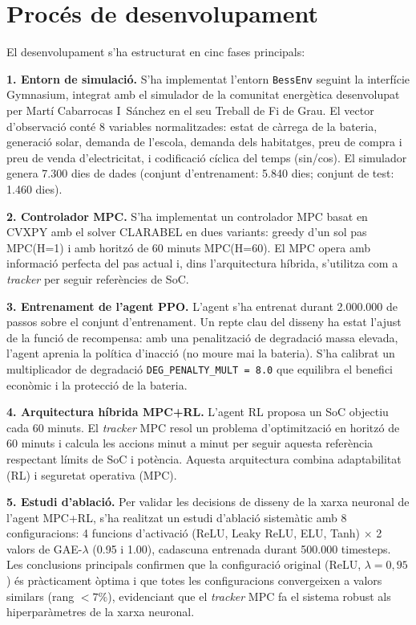 \documentclass[a4paper,12pt]{ThesisStyle}
\begin{document}
\section*{Procés de desenvolupament}

El desenvolupament s'ha estructurat en cinc fases principals:

\textbf{1. Entorn de simulació.} S'ha implementat l'entorn \texttt{BessEnv} seguint la
interfície Gymnasium, integrat amb el simulador de la comunitat energètica desenvolupat per
Martí Cabarrocas I~Sánchez en el seu Treball de Fi de Grau. El vector d'observació conté 8 variables
normalitzades: estat de càrrega de la bateria, generació solar, demanda de l'escola, demanda dels habitatges, preu de compra i preu de venda d'electricitat, i codificació cíclica del temps (sin/cos). El simulador genera 7.300 dies de
dades (conjunt d'entrenament: 5.840 dies; conjunt de test: 1.460 dies).

\textbf{2. Controlador MPC.} S'ha implementat un controlador MPC basat en CVXPY amb el solver
CLARABEL en dues variants: greedy d'un sol pas MPC(H=1) i amb horitzó de 60 minuts MPC(H=60).
El MPC opera amb informació perfecta del pas actual i, dins l'arquitectura híbrida, s'utilitza
com a \textit{tracker} per seguir referències de SoC.

\textbf{3. Entrenament de l'agent PPO.} L'agent s'ha entrenat durant 2.000.000 de passos sobre
el conjunt d'entrenament. Un repte clau del disseny ha estat l'ajust de la funció de recompensa:
amb una penalització de degradació massa elevada, l'agent aprenia la política d'inacció
(no moure mai la bateria). S'ha calibrat un multiplicador de degradació \texttt{DEG\_PENALTY\_MULT
= 8.0} que equilibra el benefici econòmic i la protecció de la bateria.

\textbf{4. Arquitectura híbrida MPC+RL.} L'agent RL proposa un SoC objectiu cada 60 minuts.
El \textit{tracker} MPC resol un problema d'optimització en horitzó de 60 minuts i calcula les
accions minut a minut per seguir aquesta referència respectant límits de SoC i potència.
Aquesta arquitectura combina adaptabilitat (RL) i seguretat operativa (MPC).

\textbf{5. Estudi d'ablació.} Per validar les decisions de disseny de la xarxa neuronal de
l'agent MPC+RL, s'ha realitzat un estudi d'ablació sistemàtic amb 8 configuracions:
4 funcions d'activació (ReLU, Leaky ReLU, ELU, Tanh) $\times$ 2 valors de GAE-$\lambda$
(0.95 i 1.00), cadascuna entrenada durant 500.000 timesteps. Les conclusions principals
confirmen que la configuració original (ReLU, $\lambda=0{,}95$) és pràcticament òptima i que
totes les configuracions convergeixen a valors similars (rang $<7\%$), evidenciant que el
\textit{tracker} MPC fa el sistema robust als hiperparàmetres de la xarxa neuronal.
\end{document}
